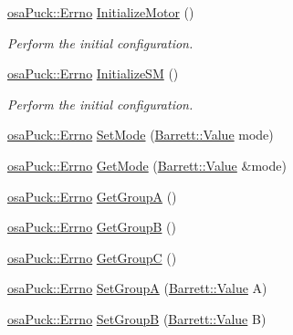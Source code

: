 \begin{DoxyCompactItemize}
\hyperlink{classosa_puck_af19c88d20083577d3a676353b4902391}{osa\+Puck\+::\+Errno} \hyperlink{classosa_puck_a823b0dc8f1c91f8191fc0bef2d8750e6}{Initialize\+Motor} ()
\begin{DoxyCompactList}\small\item\em Perform the initial configuration. \end{DoxyCompactList}\item 
\hyperlink{classosa_puck_af19c88d20083577d3a676353b4902391}{osa\+Puck\+::\+Errno} \hyperlink{classosa_puck_a9278ec33b788b5b1ab031438dac75031}{Initialize\+S\+M} ()
\begin{DoxyCompactList}\small\item\em Perform the initial configuration. \end{DoxyCompactList}\item 
\hyperlink{classosa_puck_af19c88d20083577d3a676353b4902391}{osa\+Puck\+::\+Errno} \hyperlink{classosa_puck_a6f4f3b64404db16746a36b16a505b5c5}{Set\+Mode} (\hyperlink{struct_barrett_a57ff132885344ca62e4b4b691885685b}{Barrett\+::\+Value} mode)
\item 
\hyperlink{classosa_puck_af19c88d20083577d3a676353b4902391}{osa\+Puck\+::\+Errno} \hyperlink{classosa_puck_a490be0a5ec443b71d6fcc8d1d74129e3}{Get\+Mode} (\hyperlink{struct_barrett_a57ff132885344ca62e4b4b691885685b}{Barrett\+::\+Value} \&mode)
\item 
\hyperlink{classosa_puck_af19c88d20083577d3a676353b4902391}{osa\+Puck\+::\+Errno} \hyperlink{classosa_puck_afc00d4aa540e8b7d64c5ea9fd386a18d}{Get\+Group\+A} ()
\item 
\hyperlink{classosa_puck_af19c88d20083577d3a676353b4902391}{osa\+Puck\+::\+Errno} \hyperlink{classosa_puck_a8f07dab0ed24df69c9305e5f1fefb8d4}{Get\+Group\+B} ()
\item 
\hyperlink{classosa_puck_af19c88d20083577d3a676353b4902391}{osa\+Puck\+::\+Errno} \hyperlink{classosa_puck_a6e53a5943b1a42fdc1e2b41b315a8481}{Get\+Group\+C} ()
\item 
\hyperlink{classosa_puck_af19c88d20083577d3a676353b4902391}{osa\+Puck\+::\+Errno} \hyperlink{classosa_puck_adfb90a624491772ff63121ac4f4b461d}{Set\+Group\+A} (\hyperlink{struct_barrett_a57ff132885344ca62e4b4b691885685b}{Barrett\+::\+Value} A)
\item 
\hyperlink{classosa_puck_af19c88d20083577d3a676353b4902391}{osa\+Puck\+::\+Errno} \hyperlink{classosa_puck_af0994616e3b62d2e62febae173a31ade}{Set\+Group\+B} (\hyperlink{struct_barrett_a57ff132885344ca62e4b4b691885685b}{Barrett\+::\+Value} B)
\item 

\end{DoxyCompactItemize}
